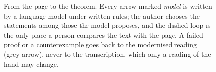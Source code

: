 \begin{figure}[t]
{}
\caption{From the page to the theorem. Every arrow marked \emph{model} is written by a language model under written rules; the author chooses the statements among those the model proposes, and the dashed loop is the only place a person compares the text with the page. A failed proof or a counterexample goes back to the modernised reading (grey arrow), never to the transcription, which only a reading of the hand may change.}\label{fig:pipeline}
\end{figure}
